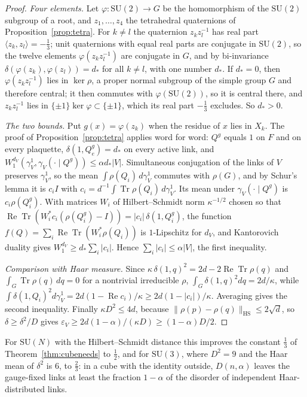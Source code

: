 \documentclass[11pt]{amsart}
\theoremstyle{definition}
\theoremstyle{remark}
\numberwithin{equation}{section}
\newcommand{\SU}{\mathrm{SU}}
\newcommand{\Tr}{\operatorname{Tr}}
\begin{document}
\begin{proof}
\emph{Four elements.} Let $\varphi\colon\SU(2)\to G$ be the homomorphism of
the $\SU(2)$ subgroup of a root, and $z_1,\dots,z_4$ the tetrahedral
quaternions of Proposition~\ref{prop:tetra}. For $k\ne l$ the quaternion
$z_kz_l^{-1}$ has real part $\langle z_k,z_l\rangle=-\frac13$; unit
quaternions with equal real parts are conjugate in $\SU(2)$, so the twelve
elements $\varphi(z_kz_l^{-1})$ are conjugate in $G$, and by bi-invariance
$\delta(\varphi(z_k),\varphi(z_l))=d_*$ for all $k\ne l$, with one number
$d_*$. If $d_*=0$, then $\varphi(z_kz_l^{-1})$ lies in $\ker\rho$, a proper
normal subgroup of the simple group $G$ and therefore central; it then
commutes with $\varphi(\SU(2))$, so it is central there, and $z_kz_l^{-1}$
lies in $\{\pm1\}\ker\varphi\subset\{\pm1\}$, which its real part $-\frac13$
excludes. So $d_*>0$.

\emph{The two bounds.} Put $g(x)=\varphi(z_k)$ when the residue of $x$ lies
in $X_k$. The proof of Proposition~\ref{prop:tetra} applies word for word:
$Q^g$ equals $1$ on $F$ and on every plaquette, $\delta(1,Q^g_e)=d_*$ on
every active link, and $W_1^{d_V}(\gamma^1_V,\gamma_V(\cdot\mid Q^g))\le
\alpha d_*|V|$. Simultaneous conjugation of the links of $V$ preserves
$\gamma^1_V$, so the mean $\int\rho(Q_i)\,d\gamma^1_V$ commutes with
$\rho(G)$, and by Schur's lemma it is $c_iI$ with $c_i=d^{-1}\int\Tr\rho(Q_i)
\,d\gamma^1_V$. Its mean under $\gamma_V(\cdot\mid Q^g)$ is $c_i\rho(Q^g_i)$.
With matrices $W_i$ of Hilbert--Schmidt norm $\kappa^{-1/2}$ chosen so that
$\operatorname{Re}\Tr(W_i^*c_i(\rho(Q^g_i)-I))=|c_i|\,\delta(1,Q^g_i)$, the
function $f(Q)=\sum_i\operatorname{Re}\Tr(W_i^*\rho(Q_i))$ is $1$-Lipschitz
for $d_V$, and Kantorovich duality gives $W_1^{d_V}\ge d_*\sum_i|c_i|$.
Hence $\sum_i|c_i|\le\alpha|V|$, the first inequality.

\emph{Comparison with Haar measure.} Since $\kappa\,\delta(1,q)^2=2d-2
\operatorname{Re}\Tr\rho(q)$ and $\int_G\Tr\rho(q)\,dq=0$ for a nontrivial
irreducible $\rho$, $\int_G\delta(1,q)^2dq=2d/\kappa$, while $\int\delta(1,
Q_i)^2d\gamma^1_V=2d(1-\operatorname{Re}c_i)/\kappa\ge2d(1-|c_i|)/\kappa$.
Averaging gives the second inequality. Finally $\kappa D^2\le4d$, because
$\|\rho(p)-\rho(q)\|_{\mathrm{HS}}\le2\sqrt d$, so $\delta\ge\delta^2/D$
gives $\varepsilon_V\ge2d(1-\alpha)/(\kappa D)\ge(1-\alpha)D/2$.
\end{proof}

For $\SU(N)$ with the Hilbert--Schmidt distance this improves the constant
$\frac13$ of Theorem~\ref{thm:cubeneeds} to $\frac12$, and for $\SU(3)$, where
$D^2=9$ and the Haar mean of $\delta^2$ is $6$, to $\frac23$: in a cube with
the identity outside, $D(n,\alpha)$ leaves the gauge-fixed links at least the
fraction $1-\alpha$ of the disorder of independent Haar-distributed links.
\end{document}
